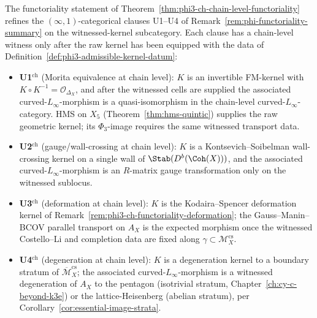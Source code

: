 \begin{remark}
\label{rem:phi3-ch-u1-u4-chain}
The functoriality statement of Theorem~\ref{thm:phi3-ch-chain-level-functoriality} refines the $(\infty,1)$-categorical clauses U1--U4 of Remark~\ref{rem:phi-functoriality-summary} on the witnessed-kernel subcategory. Each clause has a chain-level witness only after the raw kernel has been equipped with the data of Definition~\ref{def:phi3-admissible-kernel-datum}:
\begin{itemize}
 \item \textbf{U1$^{\mathrm{ch}}$} (Morita equivalence at chain level): $K$ is an invertible FM-kernel with $K \circ K^{-1} = \mathcal{O}_{\Delta_X}$, and after the witnessed cells are supplied the associated curved-$L_\infty$-morphism is a quasi-isomorphism in the chain-level curved-$L_\infty$-category. HMS on $X_5$ (Theorem~\ref{thm:hms-quintic}) supplies the raw geometric kernel; its $\Phi_3$-image requires the same witnessed transport data.
 \item \textbf{U2$^{\mathrm{ch}}$} (gauge/wall-crossing at chain level): $K$ is a Kontsevich--Soibelman wall-crossing kernel on a single wall of $\Stab(D^b(\Coh(X)))$, and the associated curved-$L_\infty$-morphism is an $R$-matrix gauge transformation only on the witnessed sublocus.
 \item \textbf{U3$^{\mathrm{ch}}$} (deformation at chain level): $K$ is the Kodaira--Spencer deformation kernel of Remark~\ref{rem:phi3-ch-functoriality-deformation}; the Gauss--Manin--BCOV parallel transport on $A_X$ is the expected morphism once the witnessed Costello--Li and completion data are fixed along $\gamma \subset \mathcal{M}_X^{\mathrm{cs}}$.
 \item \textbf{U4$^{\mathrm{ch}}$} (degeneration at chain level): $K$ is a degeneration kernel to a boundary stratum of $\overline{\mathcal{M}}_X^{\mathrm{cs}}$; the associated curved-$L_\infty$-morphism is a witnessed degeneration of $A_X$ to the pentagon (isotrivial stratum, Chapter~\ref{ch:cy-c-beyond-k3e}) or the lattice-Heisenberg (abelian stratum), per Corollary~\ref{cor:essential-image-strata}.
\end{itemize}
\end{remark}

